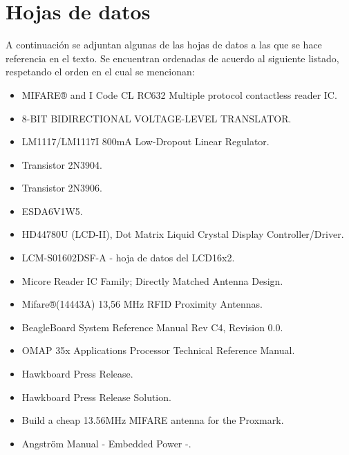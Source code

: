 \chapter{Hojas de datos}\label{HD}

A continuación se adjuntan algunas de las hojas de datos a las que se hace referencia en el texto.
Se encuentran ordenadas de acuerdo al siguiente listado, respetando el orden en el cual se mencionan:

\begin{itemize}
\item MIFARE® and I Code CL RC632 Multiple protocol contactless reader IC.
\item 8-BIT BIDIRECTIONAL VOLTAGE-LEVEL TRANSLATOR.
\item LM1117/LM1117I 800mA Low-Dropout Linear Regulator.
\item Transistor 2N3904.
\item Transistor 2N3906.
\item ESDA6V1W5.
\item HD44780U (LCD-II), Dot Matrix Liquid Crystal Display Controller/Driver.
\item LCM-S01602DSF-A - hoja de datos del LCD16x2.
\item Micore Reader IC Family; Directly Matched Antenna Design.
\item Mifare®(14443A) 13,56 MHz RFID Proximity Antennas.
\item BeagleBoard System Reference Manual Rev C4, Revision 0.0.
\item OMAP 35x Applications Processor Technical Reference Manual.
\item Hawkboard Press Release.
\item Hawkboard Press Release Solution.
\item Build a cheap 13.56MHz MIFARE antenna for the Proxmark.
\item Angström Manual - Embedded Power -.
\end{itemize}

%
%
%
%
%
%
%
%
%
%
%
%
%
%
%
%
%
%
%
%
%
%
%
%
%
%
%
%
%
%